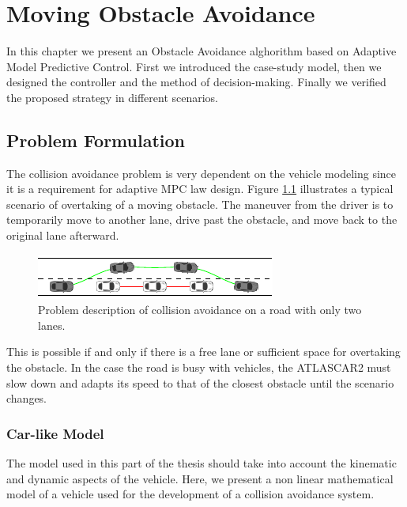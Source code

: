 \chapter{Moving Obstacle Avoidance}
In this chapter we present an Obstacle Avoidance alghorithm based on Adaptive Model Predictive Control. First we introduced the case-study model, then we designed the controller and the method of decision-making. Finally we verified the proposed strategy in different scenarios.

\section{Problem Formulation}
The collision avoidance problem is very dependent on the vehicle modeling since it is a requirement for  adaptive MPC law design. Figure \ref{fig:obstacleAvoidance} illustrates a typical scenario of overtaking of a moving obstacle. The maneuver from the driver is to temporarily move to another lane, drive past the obstacle, and move back to the original lane afterward. 
\begin{figure}[!h]
	\centering
	\includegraphics[width=\textwidth]{../figure/obstacleAvoidance/obstacleAvoidance.pdf}
	\caption{Problem description of collision avoidance on a road with only two lanes.}
	\label{fig:obstacleAvoidance}
\end{figure}

This is possible if and only if there is a free lane or  sufficient space for overtaking the obstacle. In the case the road is busy with vehicles, the ATLASCAR2 must slow down and adapts its speed to that of the closest obstacle until the scenario changes.

\subsection{Car-like Model}
The model used in this part of the thesis should take into account the kinematic and dynamic aspects of the vehicle. Here, we present a non linear mathematical model of a vehicle used for the development of a collision avoidance system.

